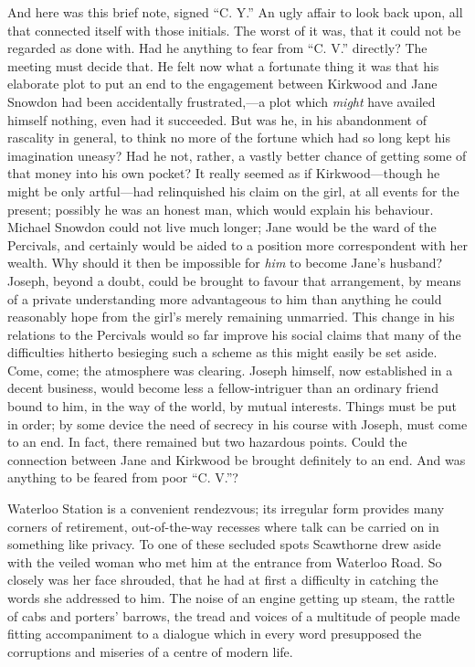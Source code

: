 And here was this brief note, signed ``C. Y.'' An ugly affair to look
back upon, all that connected itself with those initials. The worst of
it was, that it could not be regarded as done with. Had he anything to
fear from ``C. V.'' directly? The meeting must decide that. He felt now
what a fortunate thing it was that his elaborate plot to put an end to
the engagement between Kirkwood and Jane Snowdon had been accidentally
frustrated,---a plot which \emph{might} have availed himself nothing,
even had it succeeded. But was he, in his abandonment of rascality in
general, to think no more of the fortune which had so long kept his
imagination uneasy? Had he not, rather, a vastly better chance of
getting some of that money into his own {}pocket? It really seemed as if
Kirkwood---though he might be only artful---had relinquished his claim
on the girl, at all events for the present; possibly he was an honest
man, which would explain his behaviour. Michael Snowdon could not live
much longer; Jane would be the ward of the Percivals, and certainly
would be aided to a position more correspondent with her wealth. Why
should it then be impossible for \emph{him} to become Jane's husband?
Joseph, beyond a doubt, could be brought to favour that arrangement, by
means of a private understanding more advantageous to him than anything
he could reasonably hope from the girl's merely remaining unmarried.
This change in his relations to the Percivals would so far improve his
social claims that many of the difficulties hitherto besieging such a
scheme as this might easily be set aside. Come, come; the atmosphere was
clearing. Joseph himself, now established in a decent business, would
become less a fellow-intriguer than an ordinary friend bound to him, in
the way of the world, by mutual interests. Things must be put in order;
by some device the need of secrecy in his {}course with Joseph, must
come to an end. In fact, there remained but two hazardous points. Could
the connection between Jane and Kirkwood be brought definitely to an
end. And was anything to be feared from poor ``C. V.''?

Waterloo Station is a convenient rendezvous; its irregular form provides
many corners of retirement, out-of-the-way recesses where talk can be
carried on in something like privacy. To one of these secluded spots
Scawthorne drew aside with the veiled woman who met him at the entrance
from Waterloo Road. So closely was her face shrouded, that he had at
first a difficulty in catching the words she addressed to him. The noise
of an engine getting up steam, the rattle of cabs and porters' barrows,
the tread and voices of a multitude of people made fitting accompaniment
to a dialogue which in every word presupposed the corruptions and
miseries of a centre of modern life.

